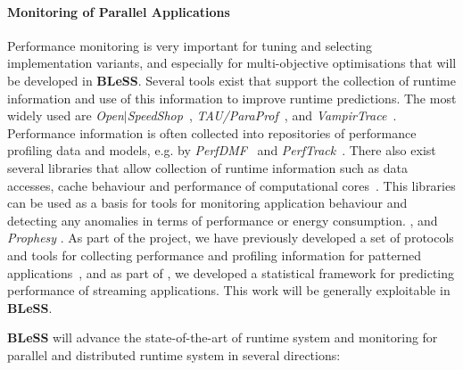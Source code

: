\documentclass[a4paper,11pt]{article}
\newcommand{\project}[1]{\textbf{#1}\xspace}
\newcommand{\BLESS}{\project{BLeSS}}
\newcommand{\TheProject}{\BLESS}
\begin{document}

\paragraph{Monitoring of Parallel Applications}
Performance monitoring is very important for tuning and 
selecting implementation variants, and especially for multi-objective
optimisations that will be developed in \TheProject. Several tools 
exist that support the collection of runtime information and use 
of this information to improve runtime predictions. The most widely 
used are \emph{Open$\vert$SpeedShop}~\cite{schulz2008open}, 
\emph{TAU/ParaProf}~\cite{shende2006tau},
and \emph{VampirTrace}~\cite{muller2007developing}. 
Performance information is often collected into repositories of 
performance profiling data and models, e.g. by
\emph{PerfDMF}~\cite{huck2005design} and 
\emph{PerfTrack}~\cite{karavanic2005integrating}. 
There also exist several libraries that allow collection of runtime
information such as data accesses, cache behaviour and performance
of computational cores~\cite{papi,pmlib}. This libraries can be used
as a basis for tools for monitoring application behaviour and
detecting any anomalies in terms of performance or energy consumption.
, and \emph{Prophesy} \cite{wu2001design}.
As part of the \paraphrase project, we have previously developed a
set of protocols and tools for collecting performance and profiling
information for patterned applications~\cite{vip},
and as part of \advanceproject, we developed a statistical framework
for predicting performance of streaming applications.
This work will be generally exploitable in \TheProject{}.

\TheProject{} will advance the state-of-the-art of runtime system and monitoring for parallel and distributed runtime system in several directions:
\end{document}
